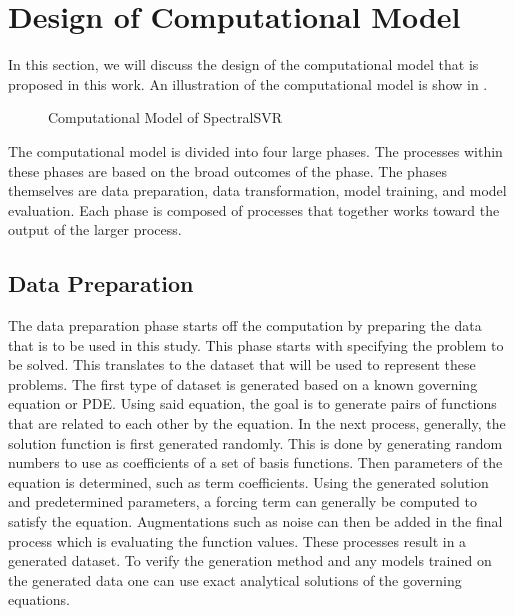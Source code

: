 \section{Design of Computational Model}\label{sec:computational_model_design}
\noindent In this section, we will discuss the design of the computational model that is proposed in this work. An illustration of the computational model is show in .

\begin{figure}[H]
  \centering
  \begin{adjustbox}{max width=\textwidth}
  \end{adjustbox}
  \caption{Computational Model of SpectralSVR}\label{fig:computational_model}
\end{figure}

The computational model is divided into four large phases. The processes within these phases are based on the broad outcomes of the phase. The phases themselves are data preparation, data transformation, model training, and model evaluation. Each phase is composed of processes that together works toward the output of the larger process.

\subsection{Data Preparation}
\noindent The data preparation phase starts off the computation by preparing the data that is to be used in this study. This phase starts with specifying the problem to be solved. This translates to the dataset that will be used to represent these problems. The first type of dataset is generated based on a known governing equation or PDE\@. Using said equation, the goal is to generate pairs of functions that are related to each other by the equation. In the next process, generally, the solution function is first generated randomly. This is done by generating random numbers to use as coefficients of a set of basis functions. Then parameters of the equation is determined, such as term coefficients. Using the generated solution and predetermined parameters, a forcing term can generally be computed to satisfy the equation. Augmentations such as noise can then be added in the final process which is evaluating the function values. These processes result in a generated dataset. To verify the generation method and any models trained on the generated data one can use exact analytical solutions of the governing equations.

